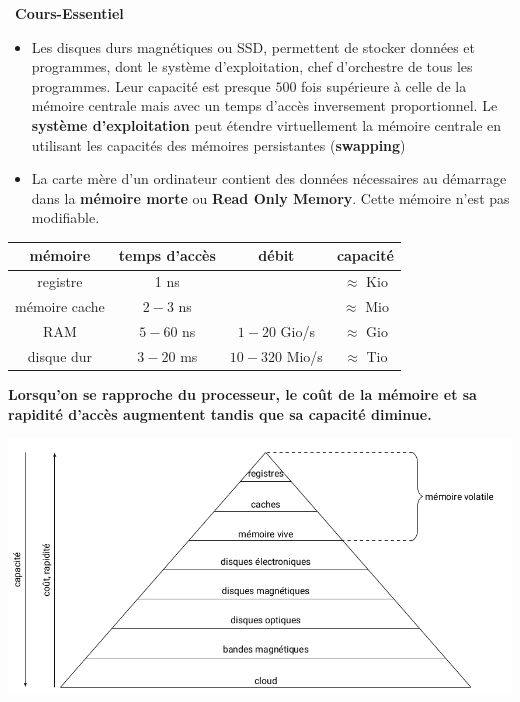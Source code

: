 \documentclass[a4paper, french, 11pt]{article}  %
\newcounter{prop}
\newcounter{cours}
\newenvironment{cours}[1]
{\par \medskip   \addtocounter{cours}{1} \noindent  
\begin{bclogo}[arrondi =0.1,  ombre = true, barre=none, logo=\bcbook, marge=4]{~\textbf{Cours-Essentiel} \textbf{\thecours} {\itshape #1} }  \par}
{
\end{bclogo}
 \par \bigskip }
\newcounter{prog}
\begin{document}
\begin{cours}{}
\begin{itemize}[label=]
   \begin{itemize}
   	\item Les disques durs magnétiques ou SSD,  permettent de stocker  données et  programmes, dont le système d'exploitation, chef d'orchestre de tous les programmes. Leur capacité est presque $500$ fois supérieure à  celle de la mémoire centrale mais avec un temps d'accès inversement proportionnel.  Le \textbf{système d'exploitation} peut étendre virtuellement la mémoire centrale en utilisant les capacités des mémoires persistantes (\textbf{swapping})
   	\item La carte mère d'un ordinateur contient des données nécessaires au démarrage dans la \textbf{mémoire morte} ou \textbf{Read Only Memory}. Cette mémoire n'est pas modifiable.
   \end{itemize}
   
\end{itemize}

\begin{center}
\begin{tabular}{|c|c|c|c|}
\hline 
\textbf{mémoire} & \textbf{temps d'accès} & \textbf{débit} & \textbf{capacité} \\ 
\hline 
registre & 1 ns &  & $\approx$ Kio \\ 
\hline 
 mémoire cache & $2-3$ ns &  & $\approx$ Mio \\ 
\hline 
RAM & $5-60$ ns & $1-20$ Gio/s & $\approx$ Gio \\ 
\hline 
disque dur & $3-20$ ms & $10-320$ Mio/s & $\approx$ Tio \\ 
\hline 
\end{tabular} 
\end{center}


\textbf{Lorsqu'on se rapproche du processeur,  le coût de la mémoire et sa rapidité d'accès augmentent tandis que sa  capacité diminue.}


\begin{center}
\includegraphics[scale=0.5]{images/hierarchie_memoire.png}
\end{center}

\end{cours}
\end{document}
